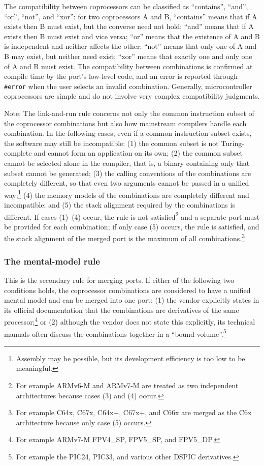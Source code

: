 The compatibility between coprocessors can be classified as ``contains'', ``and'', ``or'', ``not'', and ``xor'': for two coprocessors A and B, ``contains'' means that if A exists then B must exist, but the converse need not hold; ``and'' means that if A exists then B must exist and vice versa; ``or'' means that the existence of A and B is independent and neither affects the other; ``not'' means that only one of A and B may exist, but neither need exist; ``xor'' means that exactly one and only one of A and B must exist.
The compatibility between combinations is confirmed at compile time by the port's low-level code, and an error is reported through \texttt{\#error} when the user selects an invalid combination.
Generally, microcontroller coprocessors are simple and do not involve very complex compatibility judgments.

Note: The link-and-run rule concerns not only the common instruction subset of the coprocessor combinations but also how mainstream compilers handle each combination.
In the following cases, even if a common instruction subset exists, the software may still be incompatible: (1) the common subset is not Turing-complete and cannot form an application on its own; (2) the common subset cannot be selected alone in the compiler, that is, a binary containing only that subset cannot be generated; (3) the calling conventions of the combinations are completely different, so that even two arguments cannot be passed in a unified way;\footnote{Assembly may be possible, but its development efficiency is too low to be meaningful.} (4) the memory models of the combinations are completely different and incompatible; and (5) the stack alignment required by the combinations is different.
If cases (1)--(4) occur, the rule is not satisfied\footnote{For example ARMv6-M and ARMv7-M are treated as two independent architectures because cases (3) and (4) occur.} and a separate port must be provided for each combination; if only case (5) occurs, the rule is satisfied, and the stack alignment of the merged port is the maximum of all combinations.\footnote{For example C64x, C67x, C64x+, C67x+, and C66x are merged as the C6x architecture because only case (5) occurs.}

\subsubsection{The mental-model rule}

This is the secondary rule for merging ports.
If either of the following two conditions holds, the coprocessor combinations are considered to have a unified mental model and can be merged into one port: (1) the vendor explicitly states in its official documentation that the combinations are derivatives of the same processor;\footnote{For example ARMv7-M FPV4\_SP, FPV5\_SP, and FPV5\_DP.} or (2) although the vendor does not state this explicitly, its technical manuals often discuss the combinations together in a ``bound volume''.\footnote{For example the PIC24, PIC33, and various other DSPIC derivatives.}

